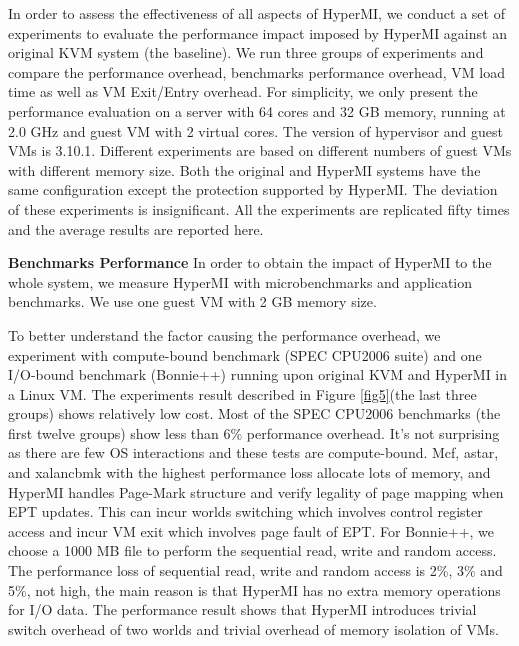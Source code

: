 \documentclass[conference]{IEEEtran}
\begin{document}
In order to assess the effectiveness of all aspects of HyperMI, we conduct a set of experiments to evaluate the performance impact imposed by HyperMI against an original KVM system (the baseline). We run three groups of experiments and compare the performance overhead, benchmarks performance overhead, VM load time as well as VM Exit/Entry overhead.
For simplicity, we only present the performance evaluation on a server with 64 cores and 32 GB memory, running at 2.0 GHz and guest VM with 2 virtual cores. The version of hypervisor and guest VMs is 3.10.1. Different experiments are based on different numbers of guest VMs with different memory size. Both the original and HyperMI systems have the same configuration except the protection supported by HyperMI. The deviation of these experiments is insignificant. All the experiments are replicated fifty times and the average results are reported here.



\textbf{Benchmarks Performance}
In order to obtain the impact of HyperMI to the whole system, we measure HyperMI with microbenchmarks and application benchmarks. 
We use one guest VM with 2 GB memory size. 

To better understand the factor causing the performance overhead, we experiment with compute-bound benchmark (SPEC CPU2006 suite) and one I/O-bound benchmark (Bonnie++) running upon original KVM and HyperMI in a Linux VM. The experiments result described in Figure \ref{fig5}(the last three groups) shows relatively low cost. Most of the SPEC CPU2006 benchmarks (the first twelve groups) show less than 6\% performance overhead. It's not surprising as there are few OS interactions and these tests are compute-bound. Mcf, astar, and xalancbmk with the highest performance loss allocate lots of memory, and HyperMI handles Page-Mark structure and verify legality of page mapping when EPT updates. This can incur worlds switching which involves control register access and incur VM exit which involves page fault of EPT.
 For Bonnie++, we choose a 1000 MB file to perform the sequential read, write and random access. The performance loss of sequential read, write and random access is 2\%, 3\% and 5\%, not high, the main reason is that HyperMI has no extra memory operations for I/O data. The performance result shows that HyperMI introduces trivial switch overhead of two worlds and trivial overhead of memory isolation of VMs.
\end{document}
